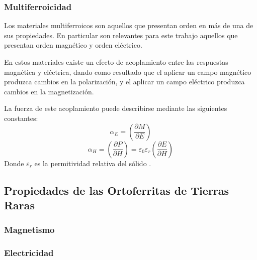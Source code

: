 \documentclass[../main.tex]{subfiles}
\begin{document}
\subsubsection{Multiferroicidad}
Los materiales multiferroicos son aquellos que presentan orden en más de una de sus propiedades. En particular son relevantes para este trabajo aquellos que presentan orden magnético y orden eléctrico.

En estos materiales existe un efecto de acoplamiento entre las respuestas magnética y eléctrica, dando como resultado que el aplicar un campo magnético produzca cambios en la polarización, y el aplicar un campo eléctrico produzca cambios en la magnetización.

La fuerza de este acoplamiento puede describirse mediante las siguientes constantes:
\begin{equation}
    \alpha_E=\left(\dfrac{\partial M}{\partial E}\right)
    \label{eq:alphaE}
\end{equation}
\begin{equation}
    \alpha_H=\left(\dfrac{\partial P}{\partial H}\right)=\varepsilon_0\varepsilon_r\left(\dfrac{\partial E}{\partial H}\right)
    \label{eq:alphaH}
\end{equation}
Donde $\varepsilon_r$ es la permitividad relativa del sólido \cite{Vopson2015}.
\subsection{Propiedades de las Ortoferritas de Tierras Raras}
\subsubsection{Magnetismo}
\subsubsection{Electricidad}
\end{document}
